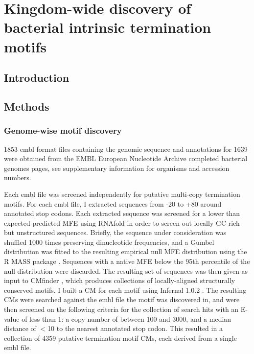 
\chapter{Kingdom-wide discovery of bacterial intrinsic termination motifs}
\label{sec:chapterPingpong}
\ifpdf
    \graphicspath{{Chapter5/Chapter5Figs/EPS/}{Chapter5/Chapter5Figs/}}
\fi

\section{Introduction}

\section{Methods}

\subsection{Genome-wise motif discovery}
1853 embl format files containing the genomic sequence and annotations for 1639 were obtained from the EMBL European Nucleotide Archive completed bacterial genomes pages, see supplementary information for organisms and accession numbers.

Each embl file was screened independently for putative multi-copy termination motifs. For each embl file, I extracted sequences from -20 to +80 around annotated stop codons. Each extracted sequence was screened for a lower than expected predicted MFE using RNAfold in order to screen out locally GC-rich but unstructured sequences. Briefly, the sequence under consideration was shuffled 1000 times preserving dinucleotide frequencies, and a Gumbel distribution was fitted to the resulting empirical null MFE distribution using the R MASS package \parencite{Venables1994}. Sequences with a native MFE below the 95th percentile of the null distribution were discarded. The resulting set of sequences was then given as input to CMfinder \parencite{Yao2006}, which produces collections of locally-aligned structurally conserved motifs. I built a CM for each motif using Infernal 1.0.2 \parencite{Nawrocki2009}.  The resulting CMs were searched against the embl file the motif was discovered in, and were then screened on the following criteria for the collection of search hits with an E-value of less than 1: a copy number of between 100 and 3000, and a median distance of $<$10 to the nearest annotated stop codon. This resulted in a collection of 4359 putative termination motif CMs, each derived from a single embl file. 

